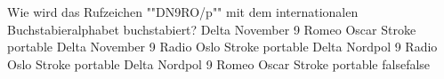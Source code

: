     {Wie wird das Rufzeichen ""DN9RO/p"" mit dem internationalen Buchstabieralphabet  buchstabiert?}
    {Delta November 9 Romeo Oscar Stroke portable}
    {Delta November 9 Radio Oslo Stroke portable}
    {Delta Nordpol 9 Radio Oslo Stroke portable}
    {Delta Nordpol 9 Romeo Oscar Stroke portable}
    {false}{false}